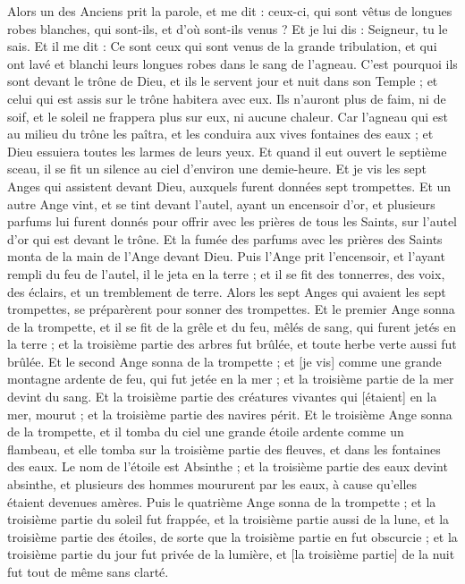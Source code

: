 \begin{multicols}{2}
Alors un des Anciens prit la parole, et me dit : ceux-ci, qui sont vêtus de longues robes blanches, qui sont-ils, et d'où sont-ils venus ?
Et je lui dis : Seigneur, tu le sais. Et il me dit : Ce sont ceux qui sont venus de la grande tribulation, et qui ont lavé et blanchi leurs longues robes dans le sang de l'agneau.
C'est pourquoi ils sont devant le trône de Dieu, et ils le servent jour et nuit dans son Temple ; et celui qui est assis sur le trône habitera avec eux.
Ils n'auront plus de faim, ni de soif, et le soleil ne frappera plus sur eux, ni aucune chaleur.
Car l'agneau qui est au milieu du trône les paîtra, et les conduira aux vives fontaines des eaux ; et Dieu essuiera toutes les larmes de leurs yeux.
\VerseOne{}Et quand il eut ouvert le septième sceau, il se fit un silence au ciel d'environ une demie-heure.
Et je vis les sept Anges qui assistent devant Dieu, auxquels furent données sept trompettes.
Et un autre Ange vint, et se tint devant l'autel, ayant un encensoir d'or, et plusieurs parfums lui furent donnés pour offrir avec les prières de tous les Saints, sur l'autel d'or qui est devant le trône.
Et la fumée des parfums avec les prières des Saints monta de la main de l'Ange devant Dieu.
Puis l'Ange prit l'encensoir, et l'ayant rempli du feu de l'autel, il le jeta en la terre ; et il se fit des tonnerres, des voix, des éclairs, et un tremblement de terre.
Alors les sept Anges qui avaient les sept trompettes, se préparèrent pour sonner des trompettes.
Et le premier Ange sonna de la trompette, et il se fit de la grêle et du feu, mêlés de sang, qui furent jetés en la terre ; et la troisième partie des arbres fut brûlée, et toute herbe verte aussi fut brûlée.
Et le second Ange sonna de la trompette ; et [je vis] comme une grande montagne ardente de feu, qui fut jetée en la mer ; et la troisième partie de la mer devint du sang.
Et la troisième partie des créatures vivantes qui [étaient] en la mer, mourut ; et la troisième partie des navires périt.
Et le troisième Ange sonna de la trompette, et il tomba du ciel une grande étoile ardente comme un flambeau, et elle tomba sur la troisième partie des fleuves, et dans les fontaines des eaux.
Le nom de l'étoile est Absinthe ; et la troisième partie des eaux devint absinthe, et plusieurs des hommes moururent par les eaux, à cause qu'elles étaient devenues amères.
Puis le quatrième Ange sonna de la trompette ; et la troisième partie du soleil fut frappée, et la troisième partie aussi de la lune, et la troisième partie des étoiles, de sorte que la troisième partie en fut obscurcie ; et la troisième partie du jour fut privée de la lumière, et [la troisième partie] de la nuit fut tout de même sans clarté.

\end{multicols}
